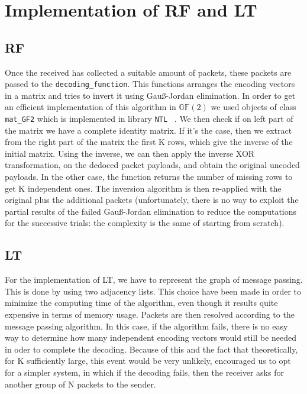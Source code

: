 \section{Implementation of RF and LT}
\subsection{RF}
Once the received has collected a suitable amount of packets, these packets are passed to the \texttt{decoding\_function}. This functions arranges the encoding vectors in a matrix and tries to invert it using Gau{\ss}-Jordan elimination. In order to get an efficient implementation of this algorithm in $\mathds{G}\mathds{F}(2)$ we used objects of class \texttt{mat\_GF2} which is implemented in library \texttt{NTL} ~\cite{NTL}. We then check if on left part of the matrix we have a complete identity matrix. If it's the case, then we extract from the right part of the matrix the first K rows, which give the inverse of the initial matrix. Using the inverse, we can then apply the inverse XOR transformation, on the dedoced packet payloads, and obtain the original uncoded payloads. In the other case, the function returns the number of missing rows to get K independent ones. The inversion algorithm is then re-applied with the original plus the additional packets (unfortunately, there is no way to exploit the partial results of the failed Gau{\ss}-Jordan elimination to reduce the computations for the successive trials: the complexity is the same of starting from scratch).
\subsection{LT}
For the implementation of LT, we have to represent the graph of message passing. This is done by using two adjacency lists. This choice have been made in order to minimize the computing time of the algorithm, even though it results quite expensive in terms of memory usage. Packets are then resolved according to the message passing algorithm. In this case, if the algorithm fails, there is no easy way to determine how many independent encoding vectors would still be needed in oder to complete the decoding. Because of this and the fact that theoretically, for K sufficiently large, this event would be very unlikely, encouraged us to opt for a simpler system, in which if the decoding fails, then the receiver asks for another group of N packets to the sender. 
